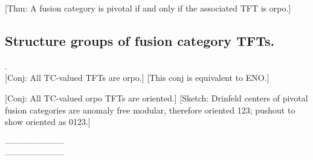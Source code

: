 \documentclass{amsart}
\begin{document}



	[Thm: A fusion category is pivotal if and only if the associated TFT is orpo.]

\subsection{Structure groups of fusion category TFTs.} .\\

	[Conj: All TC-valued TFTs are orpo.] [This conj is equivalent to ENO.]
	
	[Conj: All TC-valued orpo TFTs are oriented.] [Sketch: Drinfeld centers of pivotal fusion categories are anomaly free modular, therefore oriented 123; pushout to show oriented as 0123.]



\nid ---------------------\\
---------------------




\end{document}
